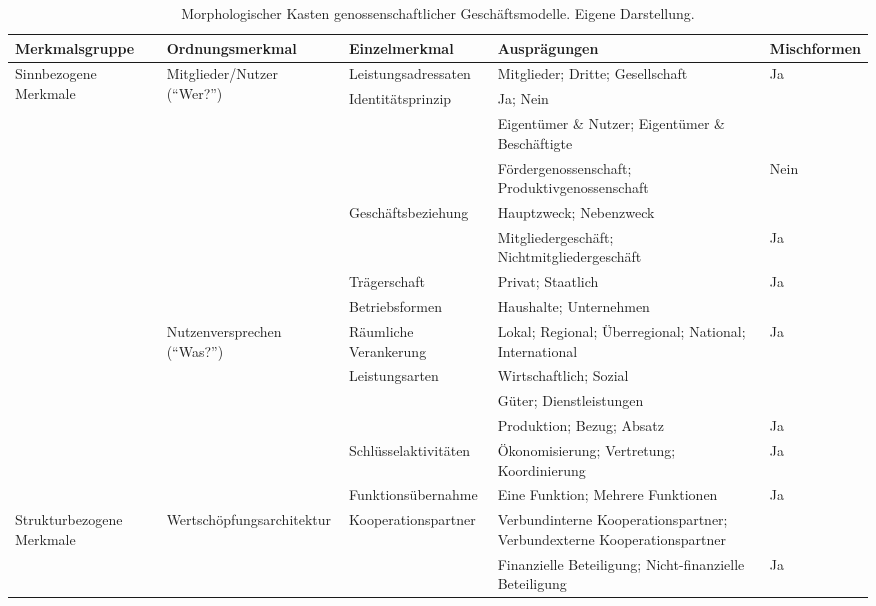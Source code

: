 \begin{sidewaystable}[htbp]
\centering
\small
\setlength{\tabcolsep}{4pt}
\renewcommand{\arraystretch}{1.3}
\caption{Morphologischer Kasten genossenschaftlicher Geschäftsmodelle. Eigene Darstellung.}
\label{tab:morphologischer_kasten}
\begin{tabularx}{\textwidth}{|p{}|p{}|p{}|X|p{}|}
\hline
\textbf{Merkmalsgruppe} & \textbf{Ordnungsmerkmal} & \textbf{Einzelmerkmal} & \textbf{Ausprägungen} & \textbf{Mischformen} \\
\hline
\multirow{14}{*}{Sinnbezogene Merkmale} & \multirow{8}{*}{Mitglieder/Nutzer (\enquote{Wer?})} & Leistungsadressaten & Mitglieder; Dritte; Gesellschaft & Ja \\
\cline{3-5}
 &  & Identit\"atsprinzip & Ja; Nein\\[-2pt]
 &  &  & Eigent\"umer \& Nutzer; Eigent\"umer \& Besch\"aftigte\\[-2pt]
 &  &  & F\"ordergenossenschaft; Produktivgenossenschaft & Nein \\
\cline{3-5}
 &  & Gesch\"aftsbeziehung & Hauptzweck; Nebenzweck\\[-2pt]
 &  &  & Mitgliedergesch\"aft; Nichtmitgliedergesch\"aft & Ja \\
\cline{3-5}
 &  & Tr\"agerschaft & Privat; Staatlich & Ja \\
\cline{3-5}
 &  & Betriebsformen & Haushalte; Unternehmen &  \\
\cline{2-5}
 & \multirow{6}{*}{Nutzenversprechen (\enquote{Was?})} & R\"aumliche Verankerung & Lokal; Regional; \"Uberregional; National; International & Ja \\
\cline{3-5}
 &  & Leistungsarten & Wirtschaftlich; Sozial\\[-2pt]
 &  &  & G\"uter; Dienstleistungen\\[-2pt]
 &  &  & Produktion; Bezug; Absatz & Ja \\
\cline{3-5}
 &  & Schl\"usselaktivit\"aten & \"Okonomisierung; Vertretung; Koordinierung & Ja \\
\cline{3-5}
 &  & Funktions\"ubernahme & Eine Funktion; Mehrere Funktionen & Ja \\
\hline
\multirow{10}{*}{Strukturbezogene Merkmale} & \multirow{6}{*}{Wertsch\"opfungsarchitektur} & Kooperationspartner & Verbundinterne Kooperationspartner; Verbundexterne Kooperationspartner\\[-2pt]
 &  &  & Finanzielle Beteiligung; Nicht-finanzielle Beteiligung & Ja \\

\end{tabularx}
\end{sidewaystable}
